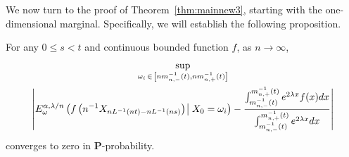 \documentclass[AHL,Unicode,longabstracts,published]{cedram}
\newcommand{\bfP}{\mathbf{P}}
\begin{document}
We now turn to the proof of Theorem~\ref{thm:mainnew3}, starting with the one-dimensional marginal. Specifically, we will establish the following proposition.

\begin{prop}\label{onedm}
For any $0\leq s<t$ and continuous bounded function $f$, as $n\rightarrow\infty$,
\begin{multline*}
\sup_{\omega_i\,\in\,\left[nm_{n,-}^{-1}(t),nm_{n,+}^{-1}(t)\right]}\\
\left|{E}^{\alpha,\lambda/n}_\omega\left(f\left(n^{-1}{X}_{nL^{-1}(nt)-nL^{-1}(ns)}\right)\:\vline\:X_0=\omega_i\right)-\frac{\int_{m_{n,-}^{-1}(t)}^{m_{n,+}^{-1}(t)}e^{2\lambda x}f(x)dx}{\int_{m_{n,-}^{-1}(t)}^{m_{n,+}^{-1}(t)}e^{2\lambda x}dx}\right|
\end{multline*}
converges to zero in $\bfP$-probability.
\end{prop}
\end{document}
